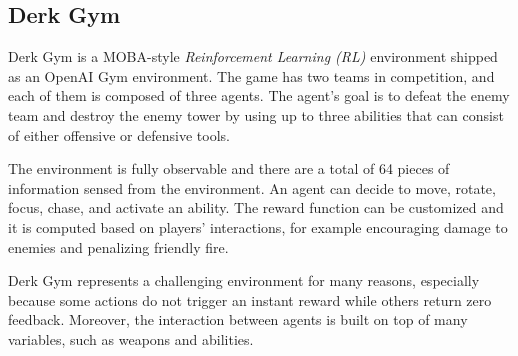 \subsection{Derk Gym}
Derk Gym is a MOBA-style \textit{Reinforcement Learning (RL)} environment shipped as an OpenAI Gym environment. The game has two teams in competition, and each of them is composed of three agents. The agent's goal is to defeat the enemy team and destroy the enemy tower by using up to three abilities that can consist of either offensive or defensive tools.

The environment is fully observable and there are a total of 64 pieces of information sensed from the environment. An agent can decide to move, rotate, focus, chase, and activate an ability. The reward function can be customized and it is computed based on players' interactions, for example encouraging damage to enemies and penalizing friendly fire. 

Derk Gym represents a challenging environment for many reasons, especially because some actions do not trigger an instant reward while others return zero feedback. Moreover, the interaction between agents is built on top of many variables, such as weapons and abilities.
